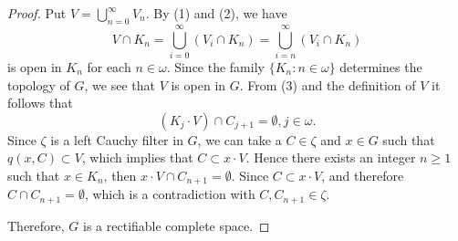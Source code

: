 \documentclass[psamsfonts,fceqn,leqno]{amsart}
\theoremstyle{definition}
\begin{document}
\begin{proof}
Put $V=\bigcup_{n=0}^{\infty}V_{n}.$ By (1) and (2), we have $$V\cap K_{n}=\bigcup_{i=0}^{\infty}(V_{i}\cap K_{n})=\bigcup_{i=n}^{\infty}(V_{i}\cap K_{n})$$ is open in $K_{n}$ for each $n\in\omega$. Since the family $\{K_{n}: n\in\omega\}$ determines the topology of $G$, we see that $V$ is open in $G$. From (3) and the definition of $V$ it follows that $$(K_{j}\cdot V)\cap C_{j+1}=\emptyset, j\in\omega.$$ Since $\zeta$ is a left Cauchy filter in $G$, we can take a $C\in\zeta$ and $x\in G$ such that $q(x, C)\subset V$, which implies that $C\subset x\cdot V$. Hence there exists an integer $n\geq 1$ such that $x\in K_{n}$, then $x\cdot V\cap C_{n+1}=\emptyset$. Since $C\subset x\cdot V$, and therefore $C\cap C_{n+1}=\emptyset$, which is a contradiction with $C, C_{n+1}\in\zeta$.

Therefore,  $G$ is a rectifiable complete space.
\end{proof}
\end{document}
